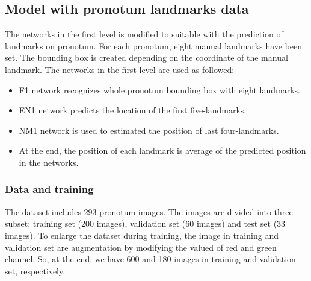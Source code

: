 \subsection{Model with pronotum landmarks data}
The networks in the first level is modified to suitable with the prediction of landmarks on pronotum. For each pronotum, eight manual landmarks have been set. The bounding box is created depending on the coordinate of the manual landmark. The networks in the first level are used as followed:
\begin{itemize}
	\item F1 network recognizes whole pronotum bounding box with eight landmarks.
	\item EN1 network predicts the location of the first five-landmarks.
	\item NM1 network is used to estimated the position of last four-landmarks.
	\item At the end, the position of each landmark is average of the predicted position in the networks.
\end{itemize} 
\subsubsection{Data and training}
The dataset includes 293 pronotum images. The images are divided into three subset: training set (200 images), validation set (60 images) and test set (33 images). To enlarge the dataset during training, the image in training and validation set are augmentation by modifying the valued of red and green channel. So, at the end, we have 600 and 180 images in training and validation set, respectively.
